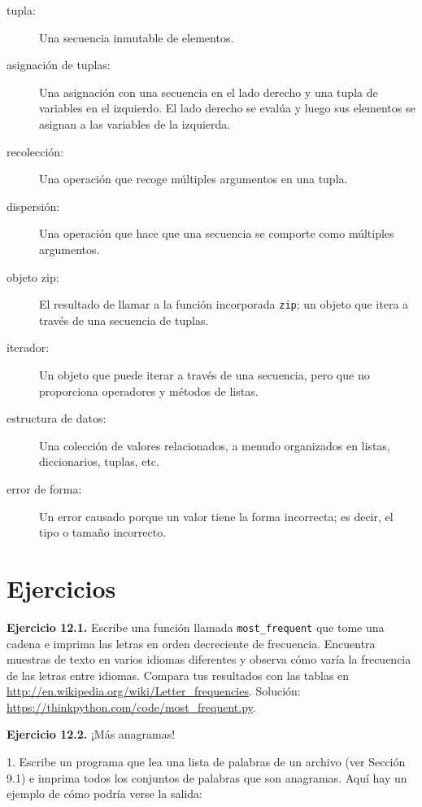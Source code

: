 \begin{description}
\item[tupla:] Una secuencia inmutable de elementos.

\item[asignación de tuplas:] Una asignación con una secuencia en el lado derecho y una tupla de variables en el izquierdo. El lado derecho se evalúa y luego sus elementos se asignan a las variables de la izquierda.

\item[recolección:] Una operación que recoge múltiples argumentos en una tupla.

\item[dispersión:] Una operación que hace que una secuencia se comporte como múltiples argumentos.

\item[objeto zip:] El resultado de llamar a la función incorporada \texttt{zip}; un objeto que itera a través de una secuencia de tuplas.

\item[iterador:] Un objeto que puede iterar a través de una secuencia, pero que no proporciona operadores y métodos de listas.

\item[estructura de datos:] Una colección de valores relacionados, a menudo organizados en listas, diccionarios, tuplas, etc.

\item[error de forma:] Un error causado porque un valor tiene la forma incorrecta; es decir, el tipo o tamaño incorrecto.
\end{description}

\section{Ejercicios}

\textbf{Ejercicio 12.1.} Escribe una función llamada \texttt{most\_frequent} que tome una cadena e imprima las letras en orden decreciente de frecuencia. Encuentra muestras de texto en varios idiomas diferentes y observa cómo varía la frecuencia de las letras entre idiomas. Compara tus resultados con las tablas en \url{http://en.wikipedia.org/wiki/Letter_frequencies}. Solución: \url{https://thinkpython.com/code/most_frequent.py}.

\textbf{Ejercicio 12.2.} ¡Más anagramas!

1. Escribe un programa que lea una lista de palabras de un archivo (ver Sección 9.1) e imprima todos los conjuntos de palabras que son anagramas. Aquí hay un ejemplo de cómo podría verse la salida:

